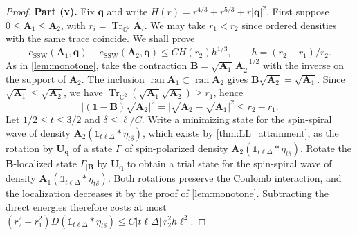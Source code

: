\documentclass[final,reqno]{amsart}
\theoremstyle{remark}
\renewcommand{\le}{\leqslant}
\renewcommand{\ge}{\geqslant}
\DeclareMathOperator{\ran}{ran}
\DeclareMathOperator{\Tr}{Tr}
\newcommand{\Trs}{\Tr_{\CC^2}}
\newcommand{\CC}{\mathbb{C}}
\newcommand{\SSW}{\mathrm{SSW}}
\newcommand{\iden}{\mathbb{1}}
\newcommand{\tetra}{\mathbb{\Delta}}
\begin{document}
\begin{proof}
\noindent\textbf{Part (v).} Fix $\mathbf{q}$ and write $H(r)=r^{4/3}+r^{5/3}+r|\mathbf{q}|^2$. First suppose $0\le\mathbf{A}_1\le\mathbf{A}_2$, with $r_i=\Trs\mathbf{A}_i$. We may take $r_1<r_2$ since ordered densities with the same trace coincide. We shall prove
$$
e_\SSW(\mathbf{A}_1,\mathbf{q})-e_\SSW(\mathbf{A}_2,\mathbf{q})\le C H(r_2)h^{1/3},
\qquad h=(r_2-r_1)/r_2.
$$
As in \cref{lem:monotone}, take the contraction $\mathbf{B}=\sqrt{\mathbf{A}_1}\,\mathbf{A}_2^{-1/2}$ with the inverse on the support of $\mathbf{A}_2$. The inclusion $\ran\mathbf{A}_1\subset\ran\mathbf{A}_2$ gives $\mathbf{B}\sqrt{\mathbf{A}_2}=\sqrt{\mathbf{A}_1}$. Since $\sqrt{\mathbf{A}_1}\le\sqrt{\mathbf{A}_2}$, we have $\Trs(\sqrt{\mathbf{A}_1}\sqrt{\mathbf{A}_2})\ge r_1$, hence
$$
\big|(\iden-\mathbf{B})\sqrt{\mathbf{A}_2}\big|^2
=\big|\sqrt{\mathbf{A}_2}-\sqrt{\mathbf{A}_1}\big|^2\le r_2-r_1.
$$
Let $1/2\le t\le3/2$ and $\delta\le\ell/C$. Write a minimizing state for the spin-spiral wave of density $\mathbf{A}_2(\iden_{t\ell\tetra}\ast\eta_{t\delta})$, which exists by \cref{thm:LL_attainment}, as the rotation by $\mathbf{U}_{\mathbf{q}}$ of a state $\Gamma$ of spin-polarized density $\mathbf{A}_2(\iden_{t\ell\tetra}\ast\eta_{t\delta})$. Rotate the $\mathbf{B}$-localized state $\Gamma_{|\mathbf{B}}$ by $\mathbf{U}_{\mathbf{q}}$ to obtain a trial state for the spin-spiral wave of density $\mathbf{A}_1(\iden_{t\ell\tetra}\ast\eta_{t\delta})$. Both rotations preserve the Coulomb interaction, and the localization decreases it by the proof of \cref{lem:monotone}. Subtracting the direct energies therefore costs at most $(r_2^2-r_1^2)D(\iden_{t\ell\tetra}\ast\eta_{t\delta})\le C|t\ell\tetra|\,r_2^2 h\ell^2$.


\end{proof}
\end{document}
